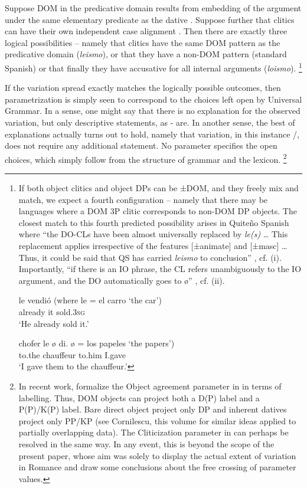 \documentclass[output=paper,colorlinks,citecolor=brown]{./langscibook}
\begin{document}
Suppose DOM in the predicative domain results from embedding of the argument under the same elementary predicate as the dative . Suppose further that clitics can have their own independent case alignment . Then there are exactly three logical possibilities – namely that clitics have the same DOM pattern as the predicative domain (\textit{leismo}), or that they have a non-DOM pattern (standard Spanish) or that finally they have accusative for all internal arguments (\textit{loismo}).{} \footnote{If both object clitics and object DPs can be ±DOM, and they freely mix and match, we expect a fourth configuration – namely that there may be languages where a DOM 3P clitic corresponds to non-DOM DP objects. The closest match to this fourth predicted possibility arises in Quiteño Spanish where “the DO-CLs have been almost universally replaced by \textit{le(s)} … This replacement applies irrespective of the features [±animate] and [±masc] …Thus, it could be said that QS has carried \textit{leismo} to conclusion” \citep[387-388]{Suñer1989}, cf. (i). Importantly, “if there is an IO phrase, the CL refers unambiguously to the IO argument, and the DO automatically goes to ø” \citep[389]{Suñer1989}, cf. (ii).  

\ea%
    \label{ex:manzini:}
     {le}   {vendió}   \hfill (where {le} {=} {el} {carro} ‘the car’)\\
        already   it   sold\textsc{.3sg}\\
    \glt ‘He already sold it.’
\z

\ea%
    \label{ex:manzini:}
     {chofer}  {le}   {ø} {di.}   {ø} = {los} {papeles} ‘the papers’)\\
        to.the chauffeur   to.him   {} I.gave\\
    \glt ‘I gave them to the chauffeur.’
\z
}

If the variation spread exactly matches the logically possible outcomes, then parametrization is simply seen to correspond to the choices left open by Universal Grammar. In a sense, one might say that there is no explanation for the observed variation, but only descriptive statements, as - are. In another sense, the best of explanations actually turns out to hold, namely that variation, in this instance /, does not require any additional statement. No parameter specifies the open choices, which simply follow from the structure of grammar and the lexicon.{} \footnote{In recent work, \citet{ManziniFranco2019} formalize the Object agreement parameter in  in terms of labelling. Thus, DOM objects can project both a D(P) label and a P(P)/K(P) label. Bare direct object project only DP and inherent datives project only PP/KP (see Cornilescu, this volume for similar ideas applied to partially overlapping data). The Cliticization parameter in  can perhaps be resolved in the same way. In any event, this is beyond the scope of the present paper, whose aim was solely to display the actual extent of variation in Romance and draw some conclusions about the free crossing of parameter values.} 
\end{document}
